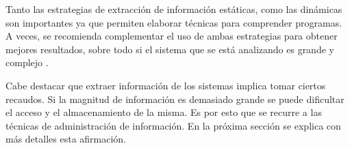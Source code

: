 \begin{description}
\end{description}

Tanto las estrategias de extracción de información estáticas, como las dinámicas son importantes ya que permiten elaborar técnicas para comprender programas. A veces, se recomienda complementar el uso de ambas estrategias para obtener mejores resultados, sobre todo si el sistema que se está analizando es grande y complejo \cite{TERD01}.


Cabe destacar que extraer información de los sistemas implica tomar ciertos recaudos. Si la magnitud de información es demasiado grande se puede dificultar el acceso y el almacenamiento de la misma. Es por esto que se recurre a las técnicas de administración de información. En la próxima sección se explica con más detalles esta afirmación.






